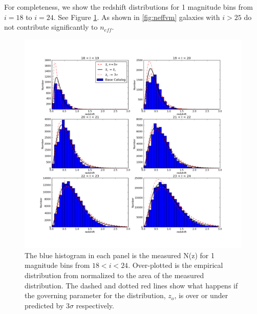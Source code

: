\documentclass[]{article}
\begin{document}
For completeness, we show the redshift distributions for 1 magnitude bins from $i=18$ to $i=24$.  See Figure \ref{fig:nofz18_24}.  As shown in \ref{fig:neffvm}
galaxies with $i > 25$ do not contribute significantly to $n_{eff}$. 

\begin{figure}[th]
\centering
\includegraphics[width=5in]{validation_figures/Nofz_18_24.png}
\caption{The blue histogram in each panel is the measured N(z) for 1 magnitude bins from $18<i<24$.  Over-plotted is the empirical distribution from \citet{coil04} normalized to the area of the measured distribution.  The dashed and dotted red lines show what happens if the governing parameter for the \citet{coil04} distribution, $z_o$, is over
or under predicted by $3\sigma$ respectively.\label{fig:nofz18_24}}
\end{figure}
\end{document}
